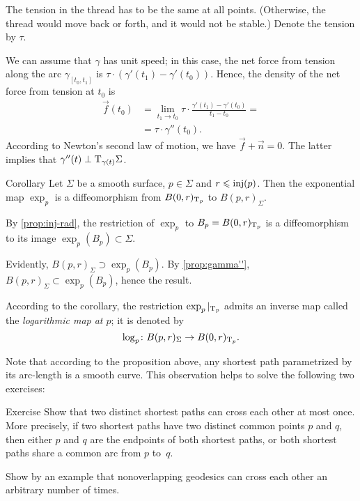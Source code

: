 The tension in the thread has to be the same at all points. (Otherwise, the thread would move back or forth, and it would not be stable.)
Denote the tension by $\tau$.

We can assume that $\gamma$ has unit speed;
in this case, the net force from tension along the arc $\gamma_{[t_0,t_1]}$ is $\tau\cdot(\gamma'(t_1)-\gamma'(t_0))$.
Hence, the density of the net force from tension at $t_0$ is 
\begin{align*}
\vec f(t_0)&=\lim_{t_1\to t_0}\tau\cdot\frac{\gamma'(t_1)-\gamma'(t_0)}{t_1-t_0}=
\\
&=\tau\cdot\gamma''(t_0).
\end{align*}
According to Newton's second law of motion, we have 
$\vec f+\vec n=0$.
The latter implies that $\gamma''(t)\perp\mathrm{T}_{\gamma(t)}\Sigma$.
\qeds

\begin{thm}{Corollary}
Let $\Sigma$ be a smooth surface, $p\in\Sigma$ and $r\z\le \inj(p)$.
Then the exponential map $\exp_p$ is a diffeomorphism from $B(0,r)_{\mathrm{T}_p}$ to $B(p,r)_\Sigma$.
\end{thm}

By \ref{prop:inj-rad}, the restriction of $\exp_p$ to $B_p={B(0,r)_{\mathrm{T}_p}}$ is a diffeomorphism to its image $\exp_p(B_p)\subset \Sigma$.

Evidently, $B(p,r)_\Sigma\supset\exp_p(B_p)$.
By \ref{prop:gamma''}, $B(p,r)_\Sigma\subset\exp_p(B_p)$, hence the result.
\qeds

According to the corollary, the restriction $\exp_p|_{\mathrm{T}_p}$ admits an inverse map called the \emph{logarithmic map at $p$};
it is denoted by \[\log_p\colon B(p,r)_\Sigma\to B(0,r)_{\mathrm{T}_p}.\]

Note that according to the proposition above, any shortest path parametrized by its arc-length is a smooth curve.
This observation helps to solve the following two exercises:

\begin{thm}{Exercise}\label{ex:two-min-geod}
Show that two distinct shortest paths can cross each other at most once.
More precisely, if two shortest paths have two distinct common points $p$ and $q$, then either $p$ and $q$ are the endpoints of both shortest paths, or both shortest paths share a common arc from $p$ to~$q$.

Show by an example that nonoverlapping geodesics can cross each other an arbitrary number of times.
\end{thm}

